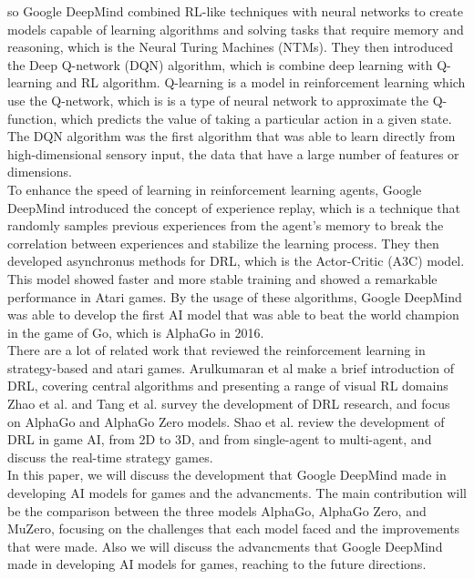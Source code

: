 so Google DeepMind combined RL-like techniques with neural networks to create models capable of 
learning algorithms and solving tasks that require memory and reasoning, which is the Neural Turing 
Machines (NTMs)\cite{I4}.
They then introduced the Deep Q-network (DQN) algorithm, which is combine deep learning 
with Q-learning and RL algorithm. Q-learning is a model in reinforcement learning which use 
the Q-network, which is is a type of neural network to approximate the Q-function, which predicts 
the value of taking a particular action in a given state\cite{I5}. The DQN algorithm was the first 
algorithm that was able to learn directly from high-dimensional sensory input, the data that have a 
large number of features or dimensions\cite{I6}.\\
To enhance the speed of learning in reinforcement learning agents, Google DeepMind introduced the 
concept of experience replay, which is a technique that randomly samples previous experiences from 
the agent's memory to break the correlation between experiences and stabilize the learning process\cite{I7}. 
They then developed asynchronus methods for DRL, which is the Actor-Critic (A3C) model. This model showed 
faster and more stable training and showed a remarkable performance in Atari games\cite{I8}. By the usage of 
these algorithms, Google DeepMind was able to develop the first AI model that was able to beat the world 
champion in the game of Go, which is AlphaGo in 2016.\\ 
There are a lot of related work that reviewed the reinforcement learning in strategy-based and atari games. 
Arulkumaran et al\cite{I9} make a brief introduction of DRL, covering central algorithms and presenting a 
range of visual RL domains Zhao et al.\cite{I10} and Tang et al.\cite{I11} survey the development of DRL 
research, and focus on AlphaGo and AlphaGo Zero models. Shao et al.\cite{I12} review the development of 
DRL in game AI, from 2D to 3D, and from single-agent to multi-agent, and discuss the real-time strategy games.\\
In this paper, we will discuss the development that Google DeepMind made in developing AI models for games and 
the advancments. The main contribution will be the comparison between the three models AlphaGo, AlphaGo Zero, 
and MuZero, focusing on the challenges that each model faced and the improvements that were made. Also we will 
discuss the advancments that Google DeepMind made in developing AI models for games, reaching to the future directions.